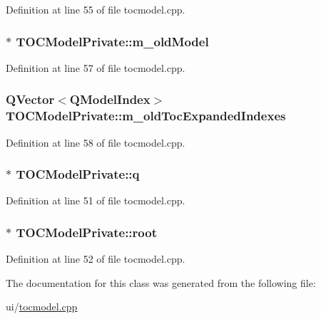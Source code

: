 Definition at line 55 of file tocmodel.\+cpp.

\hypertarget{classTOCModelPrivate_afda697cbbdd9c302f0f5e4430aec766d}{
\subsubsection[{m\+\_\+old\+Model}]{$\ast$ T\+O\+C\+Model\+Private\+::m\+\_\+old\+Model}}\label{classTOCModelPrivate_afda697cbbdd9c302f0f5e4430aec766d}


Definition at line 57 of file tocmodel.\+cpp.

\hypertarget{classTOCModelPrivate_a6d1082a48d7387adb669e7db510fed3d}{
\subsubsection[{m\+\_\+old\+Toc\+Expanded\+Indexes}]{\setlength{\rightskip}{0pt plus 5cm}Q\+Vector$<$Q\+Model\+Index$>$ T\+O\+C\+Model\+Private\+::m\+\_\+old\+Toc\+Expanded\+Indexes}}\label{classTOCModelPrivate_a6d1082a48d7387adb669e7db510fed3d}


Definition at line 58 of file tocmodel.\+cpp.

\hypertarget{classTOCModelPrivate_a22a41d3fb9786c71c9188ae25efc4330}{
\subsubsection[{q}]{$\ast$ T\+O\+C\+Model\+Private\+::q}}\label{classTOCModelPrivate_a22a41d3fb9786c71c9188ae25efc4330}


Definition at line 51 of file tocmodel.\+cpp.

\hypertarget{classTOCModelPrivate_aef31607506591767d03b45fbadad2362}{
\subsubsection[{root}]{$\ast$ T\+O\+C\+Model\+Private\+::root}}\label{classTOCModelPrivate_aef31607506591767d03b45fbadad2362}


Definition at line 52 of file tocmodel.\+cpp.



The documentation for this class was generated from the following file\+:\begin{DoxyCompactItemize}
\item 
ui/\hyperlink{tocmodel_8cpp}{tocmodel.\+cpp}\end{DoxyCompactItemize}

